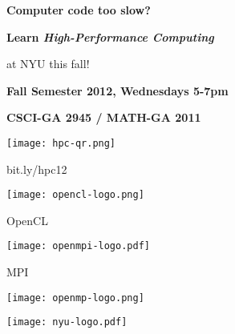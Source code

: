 \documentclass[10pt]{article}
\begin{document}
%
%
\vspace{-5ex}

\begin{center}
  {\bfseries\Large
    Computer code too slow?\\[2mm]
  }
  {\bfseries\Huge
    Learn \emph{High-Performance Computing}

    at NYU this fall!
  }
\end{center}
\vspace{8mm}



\vspace{1.5cm}
\begin{center}
  {\bfseries\Huge
    Fall Semester 2012, Wednesdays 5-7pm
  }

  {\bfseries\Large CSCI-GA 2945 / MATH-GA 2011 }

\end{center}

\begin{center}
  \begin{minipage}{0.2\textwidth}
    \centering
    \texttt{[image: hpc-qr.png]}

    \LARGE\textsf{bit.ly/hpc12}
  \end{minipage}%
  \begin{minipage}{0.2\textwidth}
    \centering
    \texttt{[image: opencl-logo.png]}

    \Large{}\selectfont OpenCL
  \end{minipage}%
  \begin{minipage}{0.2\textwidth}
    \centering
    \texttt{[image: openmpi-logo.pdf]}

    \Large{}\selectfont MPI
  \end{minipage}%
  \begin{minipage}{0.2\textwidth}
    \texttt{[image: openmp-logo.png]}
  \end{minipage}%
  \begin{minipage}{0.2\textwidth}
    \centering
    \texttt{[image: nyu-logo.pdf]}
  \end{minipage}
\end{center}
\end{document}
